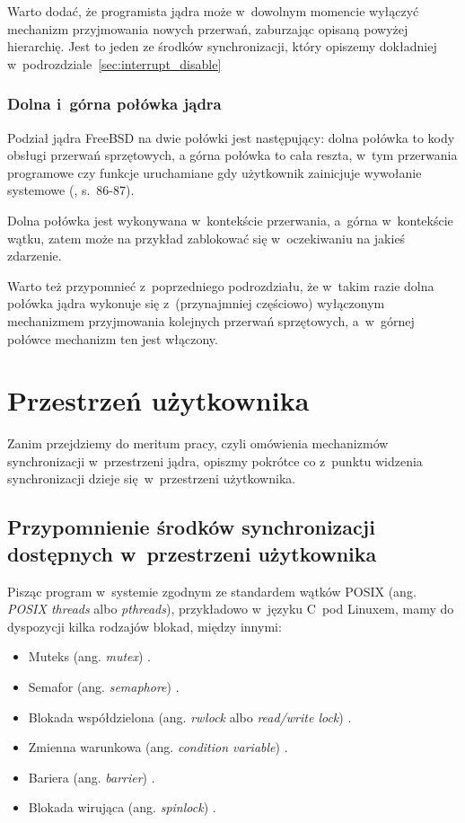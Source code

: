 \documentclass[shortabstract]{iithesis}
\theoremstyle{definition} \newtheorem*{definition}{Definicja}
\theoremstyle{definition} \newtheorem*{example}{Przykład}
\theoremstyle{definition} \newtheorem*{remark}{Uwaga}
\begin{document}
Warto dodać, że programista jądra może w~dowolnym momencie wyłączyć mechanizm przyjmowania nowych przerwań,
zaburzając opisaną powyżej hierarchię.
Jest to jeden ze środków synchronizacji, który opiszemy dokładniej w~podrozdziale~\ref{sec:interrupt_disable}

\subsection{Dolna i~górna połówka jądra}

Podział jądra FreeBSD na dwie połówki jest następujący: dolna połówka to kody obsługi przerwań sprzętowych,
a górna połówka to cała reszta, w~tym przerwania programowe czy funkcje uruchamiane gdy użytkownik zainicjuje
wywołanie systemowe (\cite{bib:freebsd}, s.~86-87).

Dolna połówka jest wykonywana w~kontekście przerwania, a~górna w~kontekście wątku, zatem może na przykład
zablokować się w~oczekiwaniu na jakieś zdarzenie.

Warto też przypomnieć z~poprzedniego podrozdziału, że w~takim razie dolna połówka jądra wykonuje się
z~(przynajmniej częściowo) wyłączonym mechanizmem przyjmowania kolejnych przerwań sprzętowych,
a~w~górnej połówce mechanizm ten jest włączony.

\chapter{Przestrzeń użytkownika}

Zanim przejdziemy do meritum pracy, czyli omówienia mechanizmów synchronizacji w~przestrzeni jądra,
opiszmy pokrótce co z~punktu widzenia synchronizacji dzieje się w~przestrzeni użytkownika.

\section{Przypomnienie środków synchronizacji dostępnych w~przestrzeni użytkownika}
\label{sec:user-space-synchronization}

Pisząc program w~systemie zgodnym ze standardem
wątków POSIX (ang. \textit{POSIX threads} albo \textit{pthreads}), przykładowo w~języku C~pod
Linuxem, mamy do dyspozycji kilka rodzajów blokad, między innymi:

\begin{itemize}
\item Muteks (ang. \textit{mutex}) \cite{bib:pthreads:mutex}.
\item Semafor (ang. \textit{semaphore}) \cite{bib:pthreads:sem}.
\item Blokada współdzielona (ang. \textit{rwlock} albo \textit{read/write lock}) \cite{bib:pthreads:rwlock}.
\item Zmienna warunkowa (ang. \textit{condition variable}) \cite{bib:pthreads:cond}.
\item Bariera (ang. \textit{barrier}) \cite{bib:pthreads:barrier}.
\item Blokada wirująca (ang. \textit{spinlock}) \cite{bib:pthreads:spin}.
\end{itemize}
\end{document}
